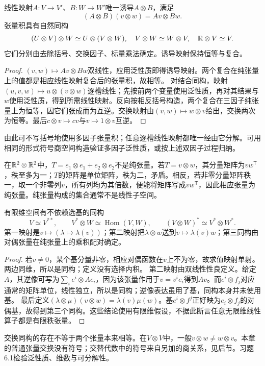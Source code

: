\begin{proposition}[映射、结合与交换同构]\label{prop:tensor-maps}
线性映射$A:V\to V'$、$B:W\to W'$唯一诱导$A\otimes B$，满足
\[
 (A\otimes B)(v\otimes w)=Av\otimes Bw.
\]
张量积具有自然同构
\[
 (U\otimes V)\otimes W\simeq U\otimes(V\otimes W),\quad
 V\otimes W\simeq W\otimes V,\quad \mathbb{R}\otimes V\simeq V.
\]
它们分别由去除括号、交换因子、标量乘法确定。诱导映射保持恒等与复合。
\end{proposition}
\begin{proof}
$(v,w)\mapsto Av\otimes Bw$双线性，应用泛性质即得诱导映射。两个复合在纯张量上的值都是相应线性映射复合后的张量积，故相等。
对结合同构，映射$(u,v,w)\mapsto u\otimes(v\otimes w)$逐槽线性；先按前两个变量使用泛性质，再对其结果与$w$使用泛性质，得到所需线性映射。反向按相反括号构造，两个复合在三因子纯张量上为恒等，因它们张成而为互逆。交换映射由$(v,w)\mapsto w\otimes v$给出，交换两次为恒等。最后$c\otimes v\mapsto cv$与$v\mapsto1\otimes v$互逆。
\end{proof}
由此可不写括号地使用多因子张量积；任意逐槽线性映射都唯一经由它分解。可用相同的形式符号商空间构造验证多因子泛性质，或按上述双因子过程归纳。
\begin{example}[和张量不一定为纯张量]\label{ex:tensor-rank}
在$\mathbb{R}^2\otimes\mathbb{R}^2$中，$T=e_1\otimes e_1+e_2\otimes e_2$不是纯张量。若$T=v\otimes w$，其分量矩阵为$vw^{\mathsf T}$，秩至多为一；$T$的矩阵是单位矩阵，秩为二，矛盾。相反，若非零分量矩阵秩一，取一个非零列$v$，所有列均为其倍数，便能将矩阵写成$vw^{\mathsf T}$，因此相应张量为纯张量。纯张量构成的集合通常不是线性子空间。
\end{example}
\begin{proposition}[对偶与线性算子]\label{prop:tensor-hom}
有限维空间有不依赖选基的同构
\[
 V\simeq V^{**},\qquad
 V^*\otimes W\simeq\operatorname{Hom}(V,W),\qquad
 (V\otimes W)^*\simeq V^*\otimes W^*.
\]
第一映射是$v\mapsto(\lambda\mapsto\lambda(v))$；第二映射把$\lambda\otimes w$送到$v\mapsto\lambda(v)w$；第三同构由对偶张量在纯张量上的乘积配对确定。
\end{proposition}
\begin{proof}
若$v\ne0$，某个基分量非零，相应对偶函数在$v$上不为零，故求值映射单射。两边同维，所以是同构；定义没有选择内积。
第二映射由双线性性良定义。给定$A$，其逆像可写为$\sum_i e^i\otimes Ae_i$，因为该张量作用于$v=v^ie_i$得到$Av$。而$e^i\otimes f_j$对应通常的矩阵单位，线性独立，所以是同构；逆像表达虽用了基，同构本身并未使用基。
最后定义$(\lambda\otimes\mu)(v\otimes w)=\lambda(v)\mu(w)$。基$e^i\otimes f^j$正好映为$e_i\otimes f_j$的对偶基，故得到第三个同构。这些结论使用有限维假设，不据此断言任意无限维线性算子都是有限秩张量。
\end{proof}
交换同构的存在不等于两个张量本来相等。在$V\otimes V$中，一般$v\otimes w\ne w\otimes v$。本章的普通张量交换没有符号；交替代数中的符号来自另加的商关系，见后节。习题6.1检验泛性质、维数与可分解性。
